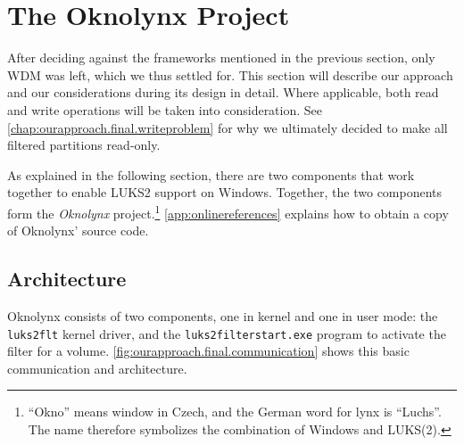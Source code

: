 \section{The Oknolynx Project}
\label{chap:ourapproach.final}
After deciding against the frameworks mentioned in the previous section, only WDM was left, which we thus settled for. This section will describe our approach and our considerations during its design in detail. Where applicable, both read and write operations will be taken into consideration. See \autoref{chap:ourapproach.final.writeproblem} for why we ultimately decided to make all filtered partitions read-only.

As explained in the following section, there are two components that work together to enable LUKS2 support on Windows. Together, the two components form the \emph{Oknolynx} project.\footnote{\label{fn:ourapproach.final.oknolynx} ``Okno'' means window in Czech, and the German word for lynx is ``Luchs''. The name therefore symbolizes the combination of Windows and LUKS(2).} \autoref{app:onlinereferences} explains how to obtain a copy of Oknolynx' source code.

\subsection{Architecture}
\label{chap:ourapproach.final.architecture}
Oknolynx consists of two components, one in kernel and one in user mode: the \texttt{luks2flt} kernel driver, and the \texttt{luks2filterstart.exe} program to activate the filter for a volume. \autoref{fig:ourapproach.final.communication} shows this basic communication and architecture.

